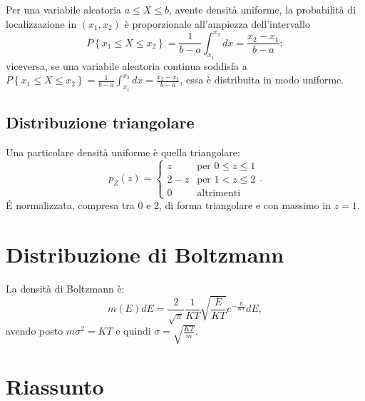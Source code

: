 Per una variabile aleatoria $a\le X\le b$, avente densità uniforme, la probabilità di localizzazione in $\left( { x }_{ 1 },{ x }_{ 2 } \right) $ è proporzionale all'ampiezza dell'intervallo \[P\left\{ { x }_{ 1 }\le X\le { x }_{ 2 } \right\} =\frac { 1 }{ b-a } \int _{ { x }_{ 1 } }^{ { x }_{ 2 } }{ dx= } \frac { { x }_{ 2 }-{ x }_{ 1 } }{ b-a }; \] viceversa, se una variabile aleatoria continua soddisfa a $P\left\{ { x }_{ 1 }\le X\le { x }_{ 2 } \right\} =\frac { 1 }{ b-a } \int _{ { x }_{ 1 } }^{ { x }_{ 2 } }{ dx= } \frac { { x }_{ 2 }-{ x }_{ 1 } }{ b-a } $, essa è distribuita in modo uniforme.

\subsection{Distribuzione triangolare} %
\label{subsec:triangolare}
Una particolare densità uniforme è quella triangolare:
\begin{equation}
p_Z(z)=
\begin{cases}
z & \textrm{per } 0\le z\le 1 \\ 2-z & \textrm{per } 1 < z \le 2\\ 0 & \textrm{altrimenti}
\end{cases}.
\end{equation}
\'E normalizzata, compresa tra 0 e 2, di forma triangolare e con massimo in $z=1$.

\section{Distribuzione di Boltzmann} %
\label{sec:boltzmann}
La densità di Boltzmann è:
\begin{equation}
\label{eq:boltzmann}
m\left( E \right) dE=\frac { 2 }{ \sqrt { \pi  }  } \frac { 1 }{ KT } \sqrt { \frac { E }{ KT }  } { e }^{ -\frac { E }{ KT }  }dE,
\end{equation}
avendo posto $m{ \sigma  }^{ 2 }=KT$ e quindi $\sigma =\sqrt { \frac { KT }{ m }  } $.

\section{Riassunto} %
\label{sec:riassunto-densità}

